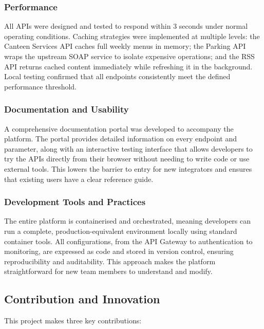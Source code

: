 \documentclass[12pt, a4paper]{report}
\begin{document}
\subsubsection{Performance}
All APIs were designed and tested to respond within 3 seconds under normal operating
conditions. Caching strategies were implemented at multiple levels: the Canteen Services
API caches full weekly menus in memory; the Parking API wraps the upstream SOAP service
to isolate expensive operations; and the RSS API returns cached content immediately while
refreshing it in the background. Local testing confirmed that all endpoints consistently
meet the defined performance threshold.

\subsubsection{Documentation and Usability}
A comprehensive documentation portal was developed to accompany the platform. The portal
provides detailed information on every endpoint and parameter, along with an interactive
testing interface that allows developers to try the APIs directly from their browser
without needing to write code or use external tools. This lowers the barrier to entry for
new integrators and ensures that existing users have a clear reference guide.

\subsubsection{Development Tools and Practices}
The entire platform is containerised and orchestrated, meaning developers can run a
complete, production-equivalent environment locally using standard container tools. All
configurations, from the API Gateway to authentication to monitoring, are expressed
as code and stored in version control, ensuring reproducibility and auditability. This
approach makes the platform straightforward for new team members to understand and modify.

\subsection{Contribution and Innovation}

This project makes three key contributions:
\end{document}
